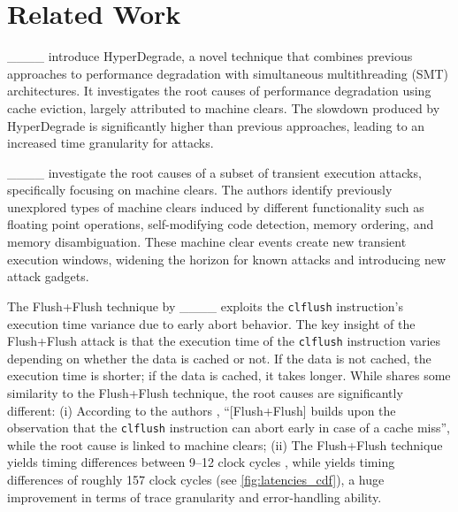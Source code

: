 \section{Related Work}
\label{sec:related}

%
____ introduce HyperDegrade, a novel technique that combines previous
approaches to performance degradation with simultaneous multithreading (SMT)
architectures. It investigates the root causes of performance degradation using
cache eviction, largely attributed to machine clears. The slowdown produced by
HyperDegrade is significantly higher than previous approaches, leading to an
increased time granularity for \FR{} attacks.

%
____ investigate the root causes of a subset of transient execution
attacks, specifically focusing on machine clears. The authors identify previously
unexplored types of machine clears induced by different functionality such as
floating point operations, self-modifying code detection, memory ordering, and
memory disambiguation. These machine clear events create new transient execution
windows, widening the horizon for known attacks and introducing new attack
gadgets.

%
The Flush+\-Flush technique by ____
exploits the \texttt{clflush} instruction's
execution time variance due to early abort behavior.
%
The key insight of the Flush+\-Flush attack is that the execution time of the
\texttt{clflush} instruction varies depending on whether the data is cached or
not. If the data is not cached, the execution time is shorter; if the data is
cached, it takes longer. While \MCHAMMER{} shares some similarity to the
Flush+\-Flush technique, the root causes are significantly different:
(i) According to the authors \cite[Section~3]{2016:flfl},
      ``[Flush+\-Flush] builds upon the observation that the \texttt{clflush}
      instruction can abort early in case of a cache miss'',
      while the \MCHAMMER{} root cause is linked to machine clears;
(ii) The Flush+Flush technique yields timing differences between 9--12 clock
      cycles \cite[Figure~1]{2016:flfl}, while \MCHAMMER{} yields timing differences
      of roughly 157 clock cycles (see \autoref{fig:latencies_cdf}),
      a huge improvement in terms of trace granularity and error-handling ability.
